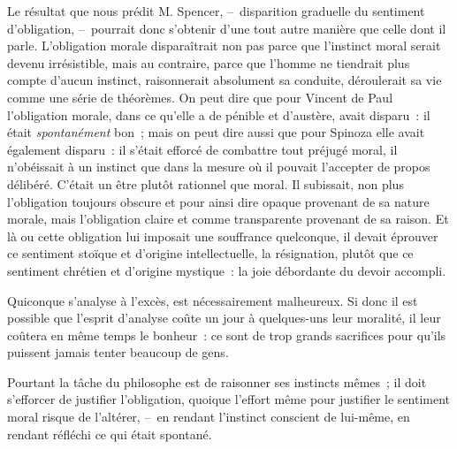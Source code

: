 \documentclass[french,twoside]{book} %
\begin{document}
Le résultat que nous prédit M. Spencer, – disparition graduelle du sentiment d’obligation, – pourrait donc s’obtenir d’une tout autre manière que celle dont il parle. L’obligation morale disparaîtrait non pas parce que l’instinct moral serait devenu irrésistible, mais au contraire, parce que l’homme ne tiendrait plus compte d’aucun instinct, raisonnerait absolument sa conduite, déroulerait sa vie comme une série de théorèmes. On peut dire que pour Vincent de Paul l’obligation morale, dans ce qu’elle a de pénible et d’austère, avait disparu : il était \emph{spontanément} bon ; mais on peut dire aussi que pour Spinoza elle avait également disparu : il s’était efforcé de combattre tout préjugé moral, il n’obéissait à un instinct que dans la mesure où il pouvait l’accepter de propos délibéré. C’était un être plutôt rationnel que moral. Il subissait, non plus l’obligation toujours obscure et pour ainsi dire opaque provenant de sa nature morale, mais l’obligation claire et comme transparente provenant de sa raison. Et là ou cette obligation lui imposait une souffrance quelconque, il devait éprouver ce sentiment stoïque et d’origine intellectuelle, la résignation, plutôt que ce sentiment chrétien et d’origine mystique : la joie débordante du devoir accompli.\par
Quiconque s’analyse à l’excès, est nécessairement malheureux. Si donc il est possible que l’esprit d’analyse coûte un jour à quelques-uns leur moralité, il leur coûtera en même temps le bonheur : ce sont de trop grands sacrifices pour qu’ils puissent jamais tenter beaucoup de gens.\par
Pourtant la tâche du philosophe est de raisonner ses instincts mêmes ; il doit s’efforcer de justifier l’obligation, quoique l’effort même pour justifier le sentiment moral risque de l’altérer, – en rendant l’instinct conscient de lui-même, en rendant réfléchi ce qui était spontané.\par
\end{document}
